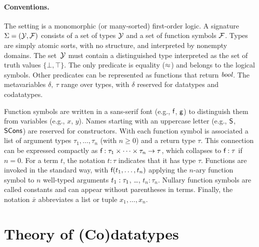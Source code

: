 \paragraph{Conventions.}
The setting is a monomorphic (or many-sorted) first-order logic.
A signature $\mathrm{\Sigma} = (\mathcal{Y}, \mathcal{F})$ consists of a set of types $\mathcal{Y}$ and a
set of function symbols $\mathcal{F}$. Types are simply atomic sorts, with no
structure, and interpreted by nonempty domains. The set~$\mathcal{Y}$ must contain a
distinguished type  interpreted as the set of truth
values $\{\bot, \top\}$. %
The only predicate is equality ($\approx$) and belongs to the logical symbols.
Other predicates can be represented as functions that return $\textit{bool}$.
The metavariables $\delta,\: \tau$ range over types, with $\delta$ reserved
for datatypes and codatatypes.

Function symbols are written in a sans-serif font (e.g., $\textsf{f}$, $\textsf{g}$) to
distinguish them from variables (e.g., $x$, $y$). Names starting with an uppercase
letter (e.g.,
$\textsf{S}$, $\textsf{SCons}$) are reserved for constructors. With each function symbol 
is associated a list of argument types $\tau_1,\ldots,\tau_n$ (with $n \ge 0$)
and a return type $\tau$. This connection can be expressed compactly as
$\textsf{f} : \tau_1 \times \cdots \times \tau_n \to \tau$,
which collapses to $\textsf{f} : \tau$ if $n = 0$.
For a term $t$, the notation $t : \tau$ indicates that it has type $\tau$.
Functions are invoked in the standard way, with $\textsf{f}(t_1,\ldots,t_n)$
applying the $n$-ary function symbol
 to $n$ well-typed arguments $t_1 :\nobreak \tau_1$, \ldots, $t_n :
\tau_n$. Nullary function symbols are called constants and can appear without
parentheses in terms.
%
Finally, the notation $\bar x$ abbreviates a list or tuple $x_1,\ldots,x_n$.


\section{Theory of (Co)datatypes}
\label{sec:theory-of-co-datatypes}


